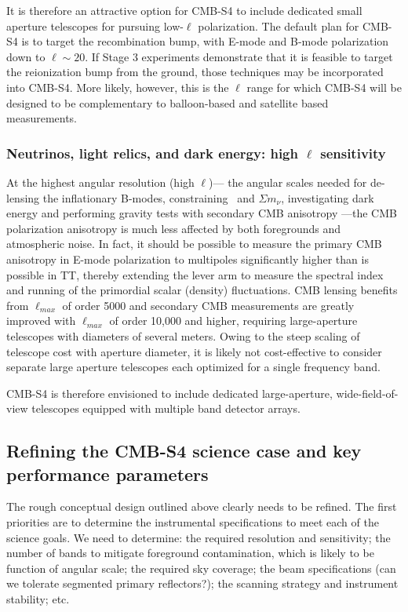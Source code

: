 It is therefore an attractive option for CMB-S4 to include dedicated small aperture telescopes for pursuing low-$\ell$ polarization. The default plan for CMB-S4 is to target the recombination bump, with E-mode and B-mode polarization down to $\ell \sim 20$. If Stage 3 experiments demonstrate that it is feasible to target the reionization bump from the ground, those techniques may be incorporated into CMB-S4. More likely, however, this is the $\ell$ range for which CMB-S4 will be designed to be complementary to balloon-based and satellite based measurements. 

\subsubsection{Neutrinos, light relics, and dark energy: high $\ell$ sensitivity}

At the highest angular resolution (high $\ell$)--- the angular scales needed for de-lensing the inflationary B-modes, constraining \neff\ and $\Sigma m_\nu$,  investigating dark energy and performing gravity tests with secondary CMB  anisotropy ---the CMB polarization anisotropy is much less affected by both foregrounds and atmospheric noise. In fact, it should be possible to measure the primary CMB anisotropy in E-mode polarization to multipoles significantly higher than is possible in TT, thereby extending the lever arm to measure the spectral index and running of the primordial scalar (density) fluctuations. CMB lensing benefits from $\ell_{max}$ of order 5000 and secondary CMB measurements are greatly improved with $\ell_{max}$ of order 10,000 and higher, requiring large-aperture telescopes with diameters of several meters. Owing to the steep scaling of telescope cost with aperture diameter, it is likely not cost-effective to consider separate large aperture telescopes each optimized for a single frequency band. 

CMB-S4 is therefore envisioned to include dedicated large-aperture, wide-field-of-view telescopes equipped with multiple band detector arrays.

\subsection{Refining the CMB-S4 science case and key performance parameters}

The rough conceptual design outlined above clearly needs to be refined.  The first priorities are to determine the instrumental specifications to meet each of the science goals. We need to determine:  the required resolution and sensitivity; the number of bands to mitigate foreground contamination, which is likely to be function of angular scale; the required sky coverage; the beam specifications (can we tolerate segmented primary reflectors?); the scanning strategy and instrument stability; etc.

